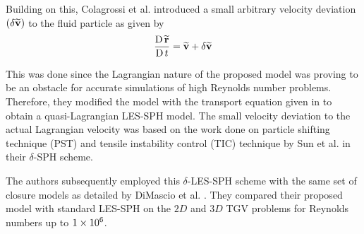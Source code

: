 Building on this, Colagrossi et al. \parencite{Colagrossi2021QuasiLagrangian} introduced a small arbitrary velocity deviation $(\delta\widetilde{\mathbf{v}})$ to the fluid particle as given by
\begin{equation}
    \frac{\operatorname{D} \widetilde{\mathbf{r}}}{\operatorname{D} t} = \widetilde{\mathbf{v}} + \delta\widetilde{\mathbf{v}} 
    \label{eq:Colagrossi2021QuasiLagrangian-r-transport}
\end{equation}

This was done since the Lagrangian nature of the proposed model was proving to be an obstacle for accurate simulations of high Reynolds number problems. Therefore, they modified the model with the transport equation given in  to obtain a quasi-Lagrangian LES-SPH model. The small velocity deviation to the actual Lagrangian velocity was based on the work done on particle shifting technique (PST) and tensile instability control (TIC) technique by Sun et al. \parencite{sun2018multi} in their $\delta$-SPH scheme.

The authors subsequently employed this $\delta$-LES-SPH scheme with the same set of closure models as detailed by DiMascio et al. \parencite{DiMascio2017}. They compared their proposed model with standard LES-SPH on the $2D$ and $3D$ TGV problems for Reynolds numbers up to $1 \times {10}^{6}$.

